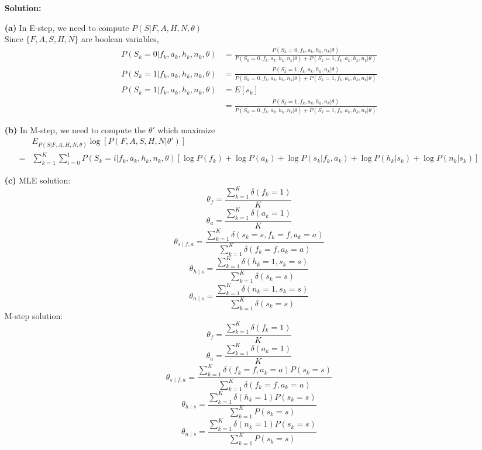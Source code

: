 \documentclass[10pt]{article}
\begin{document}
\begin{enumerate}
\textbf{Solution:}
	\item[\textbf{(a)}]
	      In E-step, we need to compute $P(S|F,A,H,N,\theta)$
	      \\Since $\{F,A,S,H,N\}$ are boolean variables,
	      $$
		      \begin{aligned}
			      P(S_k=0|f_k,a_k,h_k,n_k,\theta) & = \frac{P(S_k=0,f_k,a_k,h_k,n_k|\theta)}{P(S_k=0,f_k,a_k,h_k,n_k|\theta)+P(S_k=1,f_k,a_k,h_k,n_k|\theta)}
		      \end{aligned}
	      $$
	      $$
		      \begin{aligned}
				P(S_k=1|f_k,a_k,h_k,n_k,\theta) & = \frac{P(S_k=1,f_k,a_k,h_k,n_k|\theta)}{P(S_k=0,f_k,a_k,h_k,n_k|\theta)+P(S_k=1,f_k,a_k,h_k,n_k|\theta)}
			  \end{aligned}
	      $$
		  $$
		      \begin{aligned}
				P(S_k=1|f_k,a_k,h_k,n_k,\theta) & =E[s_k]
				  \\&=\frac{P(S_k=1,f_k,a_k,h_k,n_k|\theta)}{P(S_k=0,f_k,a_k,h_k,n_k|\theta)+P(S_k=1,f_k,a_k,h_k,n_k|\theta)}
		      \end{aligned}
	      $$
	\item[\textbf{(b)}]
		In M-step, we need to compute the $\theta'$ which maximize 
		  $$
		      \begin{aligned}
				&E_{P(S|F,A,H,N,\theta)}\log [P(F,A,S,H,N|\theta')]
				\\=&\sum_{k=1}^K \sum_{i=0}^1 P(S_k=i|f_k,a_k,h_k,n_k,\theta) [\log P(f_k)+\log P(a_k)+\log P(s_k|f_k,a_k)+\log P(h_k|s_k)+\log P(n_k|s_k)]
		      \end{aligned}
	      $$
	\item[\textbf{(c)}]MLE solution:
			$$\theta_{f} =\frac{\sum_{k=1}^{K} \delta\left(f_{k}=1\right)}{K}$$
			$$\theta_{a} =\frac{\sum_{k=1}^{K} \delta\left(a_{k}=1\right)}{K}$$
			$$\theta_{s \mid f, a} =\frac{\sum_{k=1}^{K} \delta\left(s_{k}=s,f_{k}=f, a_{k}=a\right)}{\sum_{k=1}^{K} \delta\left(f_{k}=f, a_{k}=a\right)}$$
			$$\theta_{h \mid s} =\frac{\sum_{k=1}^{K} \delta\left(h_{k}=1,s_{k}=s\right) }{\sum_{k=1}^{K} \delta\left(s_{k}=s\right)}$$
			$$\theta_{n \mid s} =\frac{\sum_{k=1}^{K} \delta\left(n_{k}=1,s_{k}=s\right) }{\sum_{k=1}^{K} \delta\left(s_{k}=s\right)}$$
	      M-step solution:
		    $$\theta_{f} =\frac{\sum_{k=1}^{K} \delta\left(f_{k}=1\right)}{K}$$
			$$\theta_{a} =\frac{\sum_{k=1}^{K} \delta\left(a_{k}=1\right)}{K}$$
			$$\theta_{s \mid f, a} =\frac{\sum_{k=1}^{K}  \delta\left(f_{k}=f, a_{k}=a\right)P\left(s_{k}=s\right)}{\sum_{k=1}^{K} \delta\left(f_{k}=f, a_{k}=a\right)}$$
			$$\theta_{h \mid s} =\frac{\sum_{k=1}^{K} \delta\left(h_{k}=1\right) P\left(s_{k}=s\right)}{\sum_{k=1}^{K} P\left(s_{k}=s\right)}$$
			$$\theta_{n \mid s} =\frac{\sum_{k=1}^{K} \delta\left(n_{k}=1\right) P\left(s_{k}=s\right)}{\sum_{k=1}^{K} P\left(s_{k}=s\right)}$$
			\newpage


\end{enumerate}
\end{document}
